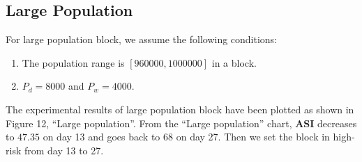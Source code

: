 \documentclass[sigplan,screen]{acmart}
\begin{document}
\subsection{Large Population}
For large population block, we assume the following conditions:
\begin{enumerate}
	\item The population range is $[960000,1000000]$ in a block.
	\item $P_d=8000$ and $P_w=4000$.
\end{enumerate}
The experimental results of large population block have been plotted as shown in Figure 12, ``Large population''.
From the ``Large population'' chart, \textbf{ASI} decreases to $47.35$ on day 13 and goes back to $68$ on day 27.
Then we set the block in high-risk from day 13 to 27.

\begin{figure}[hptb]
\end{figure}
\newpage
\end{document}
